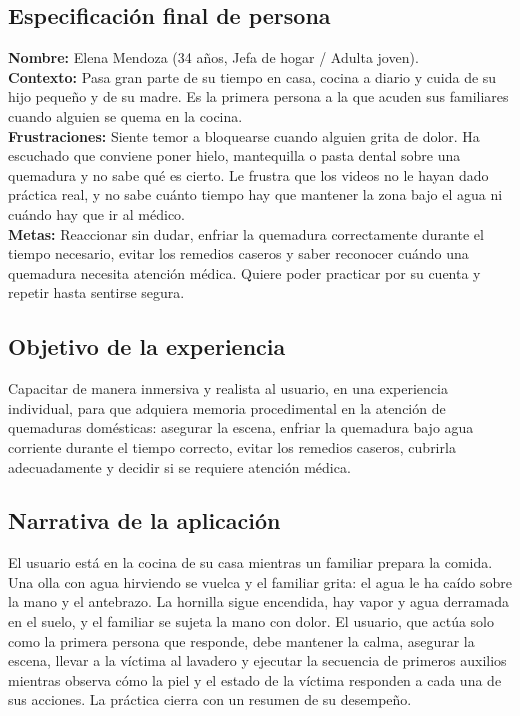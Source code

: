\documentclass[11pt,letterpaper]{article}
\begin{document}
\subsection{Especificación final de persona}

\noindent\textbf{Nombre:} Elena Mendoza (34 años, Jefa de hogar / Adulta joven).\\
\textbf{Contexto:} Pasa gran parte de su tiempo en casa, cocina a diario y cuida de su hijo pequeño y de su madre. Es la primera persona a la que acuden sus familiares cuando alguien se quema en la cocina.\\
\textbf{Frustraciones:} Siente temor a bloquearse cuando alguien grita de dolor. Ha escuchado que conviene poner hielo, mantequilla o pasta dental sobre una quemadura y no sabe qué es cierto. Le frustra que los videos no le hayan dado práctica real, y no sabe cuánto tiempo hay que mantener la zona bajo el agua ni cuándo hay que ir al médico.\\
\textbf{Metas:} Reaccionar sin dudar, enfriar la quemadura correctamente durante el tiempo necesario, evitar los remedios caseros y saber reconocer cuándo una quemadura necesita atención médica. Quiere poder practicar por su cuenta y repetir hasta sentirse segura.

\subsection{Objetivo de la experiencia}

Capacitar de manera inmersiva y realista al usuario, en una experiencia individual, para que adquiera memoria procedimental en la atención de quemaduras domésticas: asegurar la escena, enfriar la quemadura bajo agua corriente durante el tiempo correcto, evitar los remedios caseros, cubrirla adecuadamente y decidir si se requiere atención médica.

\subsection{Narrativa de la aplicación}

El usuario está en la cocina de su casa mientras un familiar prepara la comida. Una olla con agua hirviendo se vuelca y el familiar grita: el agua le ha caído sobre la mano y el antebrazo. La hornilla sigue encendida, hay vapor y agua derramada en el suelo, y el familiar se sujeta la mano con dolor. El usuario, que actúa solo como la primera persona que responde, debe mantener la calma, asegurar la escena, llevar a la víctima al lavadero y ejecutar la secuencia de primeros auxilios mientras observa cómo la piel y el estado de la víctima responden a cada una de sus acciones. La práctica cierra con un resumen de su desempeño.
\end{document}

